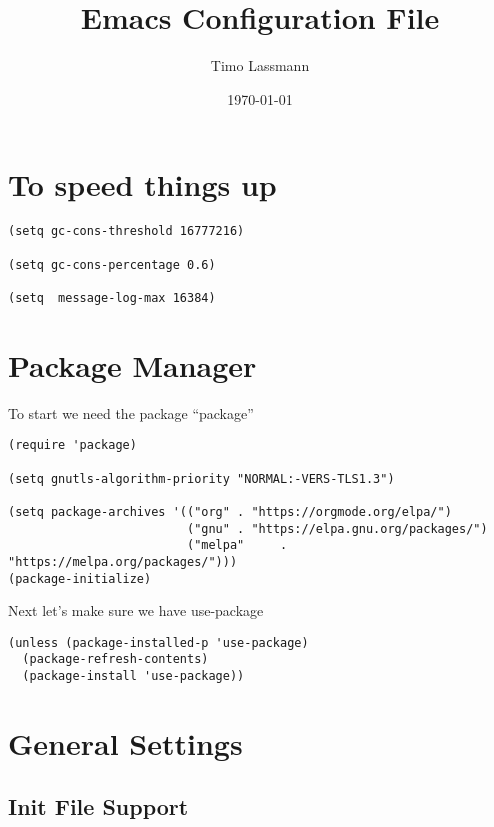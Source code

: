 \documentclass[12pt]{article}
\author{Timo Lassmann}
\date{\today}
\title{Emacs Configuration File}
\begin{document}
\maketitle

\section{To speed things up}
\label{sec:org9fcba23}

\begin{verbatim}
(setq gc-cons-threshold 16777216)

(setq gc-cons-percentage 0.6)

(setq  message-log-max 16384)

\end{verbatim}




\section{Package Manager}
\label{sec:orgf528126}
To start we need the package ``package'' 

\begin{verbatim}
(require 'package)

(setq gnutls-algorithm-priority "NORMAL:-VERS-TLS1.3")

(setq package-archives '(("org" . "https://orgmode.org/elpa/")
                         ("gnu" . "https://elpa.gnu.org/packages/")
                         ("melpa"     . "https://melpa.org/packages/")))
(package-initialize)
\end{verbatim}

Next let's make sure we have use-package

\begin{verbatim}
(unless (package-installed-p 'use-package)
  (package-refresh-contents)
  (package-install 'use-package))
\end{verbatim}

\section{General Settings}
\label{sec:org74cf5b0}
\subsection{Init File Support}
\label{sec:orgf63d0a3}
\end{document}
